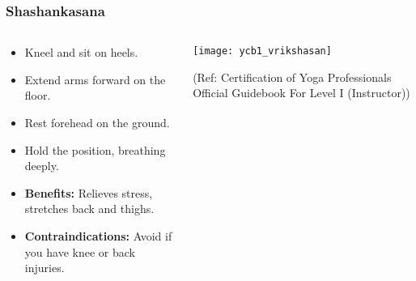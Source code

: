 \begin{frame}[fragile]\frametitle{Shashankasana}
\begin{columns}
    \begin{column}[T]{0.5\linewidth}
      \begin{itemize}
        \item Kneel and sit on heels.
        \item Extend arms forward on the floor.
        \item Rest forehead on the ground.
        \item Hold the position, breathing deeply.
        \item \textbf{Benefits:} Relieves stress, stretches back and thighs.
        \item \textbf{Contraindications:} Avoid if you have knee or back injuries.
      \end{itemize}
    \end{column}
    \begin{column}[T]{0.5\linewidth}
        \begin{center}
        \begin{center}
		        \texttt{[image: ycb1\_vrikshasan]}
				
				{\tiny (Ref: Certification  of Yoga Professionals Official Guidebook For Level I (Instructor))}	        
		\end{center}   
        \end{center}    
    \end{column}
  \end{columns}
\end{frame}


